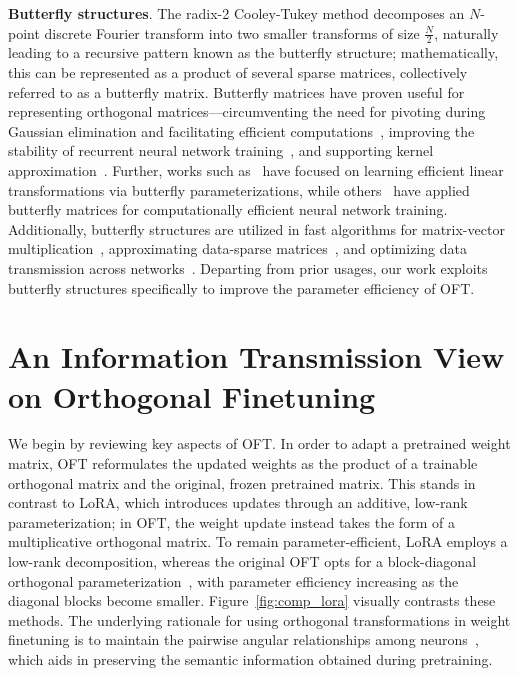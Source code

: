 \textbf{Butterfly structures}. The radix-2 Cooley-Tukey method decomposes an $N$-point discrete Fourier transform into two smaller transforms of size $\frac{N}{2}$, naturally leading to a recursive pattern known as the butterfly structure; mathematically, this can be represented as a product of several sparse matrices, collectively referred to as a butterfly matrix. Butterfly matrices have proven useful for representing orthogonal matrices—circumventing the need for pivoting during Gaussian elimination and facilitating efficient computations~\cite{parker1995random}, improving the stability of recurrent neural network training~\cite{jing2017tunable}, and supporting kernel approximation~\cite{munkhoeva2018quadrature}. Further, works such as~\cite{dao2019learning,dao2019kaleidoscope} have focused on learning efficient linear transformations via butterfly parameterizations, while others~\cite{chen2022pixelated,dao2022monarch} have applied butterfly matrices for computationally efficient neural network training. Additionally, butterfly structures are utilized in fast algorithms for matrix-vector multiplication~\cite{michielssen1996multilevel,o2010algorithm}, approximating data-sparse matrices~\cite{li2015butterfly}, and optimizing data transmission across networks~\cite{klasing1994broadcasting,li2003linear,rajasingh2016transmission}. Departing from prior usages, our work exploits butterfly structures specifically to improve the parameter efficiency of OFT.

\section{An Information Transmission View on Orthogonal Finetuning}

We begin by reviewing key aspects of OFT. In order to adapt a pretrained weight matrix, OFT reformulates the updated weights as the product of a trainable orthogonal matrix and the original, frozen pretrained matrix. This stands in contrast to LoRA, which introduces updates through an additive, low-rank parameterization; in OFT, the weight update instead takes the form of a multiplicative orthogonal matrix. To remain parameter-efficient, LoRA employs a low-rank decomposition, whereas the original OFT opts for a block-diagonal orthogonal parameterization~\cite{qiu2023controlling}, with parameter efficiency increasing as the diagonal blocks become smaller. Figure~\ref{fig:comp_lora} visually contrasts these methods. The underlying rationale for using orthogonal transformations in weight finetuning is to maintain the pairwise angular relationships among neurons~\cite{liu2018learning,liu2021orthogonal,qiu2023controlling}, which aids in preserving the semantic information obtained during pretraining. 


